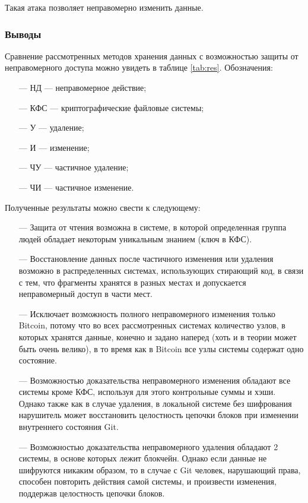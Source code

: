 Такая атака позволяет неправомерно изменить данные.

\subsubsection{Выводы}

Сравнение рассмотренных методов хранения данных с возможностью защиты от неправомерного доступа можно увидеть в таблице \ref{tab:res}. Обозначения:
\begin{itemize}
    \item[---] НД --- неправомерное действие;
    \item[---] КФС --- криптографические файловые системы;
    \item[---] У --- удаление;
    \item[---] И --- изменение;
    \item[---] ЧУ --- частичное удаление;
    \item[---] ЧИ --- частичное изменение.
\end{itemize}

Полученные результаты можно свести к следующему:
\begin{itemize}
    \item[---] Защита от чтения возможна в системе, в которой определенная группа людей обладает некоторым уникальным знанием (ключ в КФС).
    \item[---] Восстановление данных после частичного изменения или удаления возможно в распределенных системах, использующих стирающий код, в связи с тем, что фрагменты хранятся в разных местах и допускается неправомерный доступ в части мест.
    \item[---] Исключает возможность полного неправомерного изменения только Bitcoin, потому что во всех рассмотренных системах количество узлов, в которых хранятся данные, конечно и задано наперед (хоть и в теории может быть очень велико), в то время как в Bitcoin все узлы системы содержат одно состояние.
    \item[---] Возможностью доказательства неправомерного изменения обладают все системы кроме КФС, используя для этого контрольные суммы и хэши. Однако также как в случае удаления, в локальной системе без шифрования нарушитель может восстановить целостность цепочки блоков при изменении внутреннего состояния Git.
    \item[---] Возможностью доказательства неправомерного удаления обладают 2 системы, в основе которых лежит блокчейн. Однако если данные не шифруются никаким образом, то в случае с Git человек, нарушающий права, способен повторить действия самой системы, и произвести изменения, поддержав целостность цепочки блоков.
\end{itemize}

